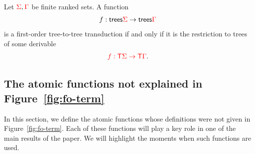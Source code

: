 




\begin{theorem}\label{thm:main}
    Let ${\color{red}{\Sigma}},{\color{red}{\Gamma}}$ be finite ranked sets. A function 
    \begin{align*}
        f : \mathsf {trees} {\color{red}{\Sigma}} \to \mathsf {trees} {\color{red}{\Gamma}}
    \end{align*}
    is a first-order tree-to-tree transduction if and only if it is the restriction to trees of some derivable
    \begin{align*}
        {\color{red}{f : {\color{red}{\mathsf T}}\Sigma \to {\color{red}{\mathsf T}}\Gamma}}.
    \end{align*}
    
\end{theorem}


%
\subsection{The atomic functions not explained in Figure~\ref{fig:fo-term}}
\label{sec:atomic-and-combinators}
In this section, we define the atomic functions whose definitions were not given in Figure~\ref{fig:fo-term}. 
Each of these functions will play a key role in one of the main results of the paper. We will highlight the moments when such functions are used.  

